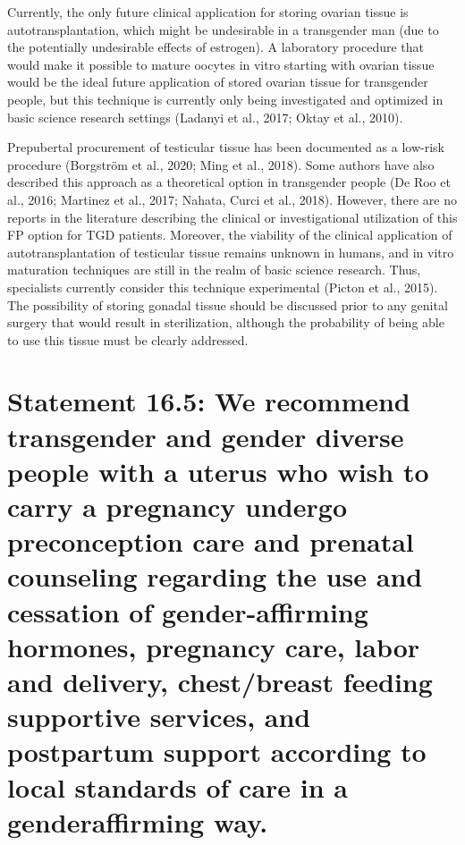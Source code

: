 \documentclass[
]{book}
\begin{document}
Currently, the only future clinical application
for storing ovarian tissue is autotransplantation,
which might be undesirable in a transgender man
(due to the potentially undesirable effects of estrogen). A laboratory procedure that would make it
possible to mature oocytes in vitro starting with
ovarian tissue would be the ideal future application
of stored ovarian tissue for transgender people,
but this technique is currently only being investigated and optimized in basic science research settings (Ladanyi et al., 2017; Oktay et al., 2010).

Prepubertal procurement of testicular tissue
has been documented as a low-risk procedure
(Borgström et al., 2020; Ming et al., 2018). Some
authors have also described this approach as a
theoretical option in transgender people (De Roo
et al., 2016; Martinez et al., 2017; Nahata, Curci
et al., 2018). However, there are no reports in
the literature describing the clinical or investigational utilization of this FP option for TGD
patients. Moreover, the viability of the clinical
application of autotransplantation of testicular
tissue remains unknown in humans, and in vitro
maturation techniques are still in the realm of
basic science research. Thus, specialists currently
consider this technique experimental (Picton
et al., 2015). The possibility of storing gonadal
tissue should be discussed prior to any genital
surgery that would result in sterilization, although
the probability of being able to use this tissue
must be clearly addressed.

\hypertarget{statement-16.5-we-recommend-transgender-and-gender-diverse-people-with-a-uterus-who-wish-to-carry-a-pregnancy-undergo-preconception-care-and-prenatal-counseling-regarding-the-use-and-cessation-of-gender-affirming-hormones-pregnancy-care-labor-and-delivery-chestbreast-feeding-supportive-services-and-postpartum-support-according-to-local-standards-of-care-in-a-genderaffirming-way.}{%
\section*{Statement 16.5: We recommend transgender and gender diverse people with a uterus who wish to carry a pregnancy undergo preconception care and prenatal counseling regarding the use and cessation of gender-affirming hormones, pregnancy care, labor and delivery, chest/breast feeding supportive services, and postpartum support according to local standards of care in a genderaffirming way.}\label{statement-16.5-we-recommend-transgender-and-gender-diverse-people-with-a-uterus-who-wish-to-carry-a-pregnancy-undergo-preconception-care-and-prenatal-counseling-regarding-the-use-and-cessation-of-gender-affirming-hormones-pregnancy-care-labor-and-delivery-chestbreast-feeding-supportive-services-and-postpartum-support-according-to-local-standards-of-care-in-a-genderaffirming-way.}}
\end{document}
